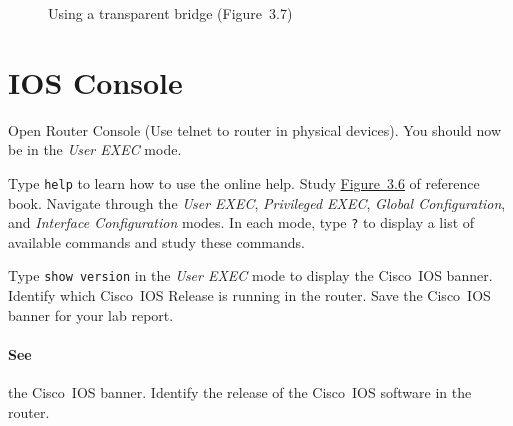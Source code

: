 \documentclass{../UTNetLab}
\begin{document}
    \begin{figure}[H]
        \centering
        \caption{Using a transparent bridge (Figure~3.7)}\label{fig:3.7}
    \end{figure}


\section{IOS Console}
    Open Router Console (Use telnet to router in physical devices).
    You should now be in the \textit{User EXEC} mode.

    Type \lstinline[language={cisco}]{help} to learn how to use the online help.
    Study \hyperref[fig:3.6]{Figure~3.6} of reference book. Navigate through the \textit{User EXEC}, \textit{Privileged EXEC}, \textit{Global Configuration}, and \textit{Interface Configuration} modes. In each mode, type \lstinline[language={cisco}]{?} to display a list of available commands and study these commands.

    Type \lstinline[language={cisco}]{show version} in the \textit{User EXEC} mode to display the Cisco~IOS banner.
    Identify which Cisco~IOS Release is running in the router.
    Save the Cisco~IOS banner for your lab report.
    
    \paragraph{See} the Cisco~IOS banner.
    Identify the release of the Cisco~IOS software in the router.
\end{document}
